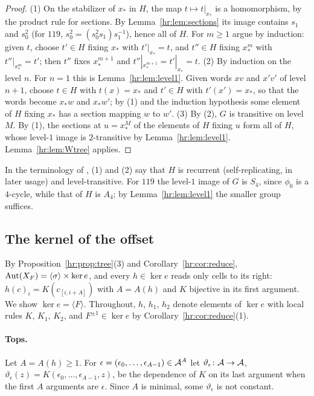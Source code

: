\begin{proof}
(1) On the stabilizer of $x_*$ in $H$, the map $t\mapsto t|_{x_*}$ is a homomorphism, by the product rule for sections. By Lemma~\ref{hr:lem:sections} its image contains $s_1$ and $s_0^2$ (for $119$, $s_0^2=(s_0^2s_1)s_1^{-1}$), hence all of $H$. For $m\ge1$ argue by induction: given $t$, choose $t'\in H$ fixing $x_*$ with $t'|_{x_*}=t$, and $t''\in H$ fixing $x_*^{m}$ with $t''|_{x_*^m}=t'$; then $t''$ fixes $x_*^{m+1}$ and $t''|_{x_*^{m+1}}=t'|_{x_*}=t$. (2) By induction on the level $n$. For $n=1$ this is Lemma~\ref{hr:lem:level1}. Given words $xv$ and $x'v'$ of level $n+1$, choose $t\in H$ with $t(x)=x_*$ and $t'\in H$ with $t'(x')=x_*$, so that the words become $x_*w$ and $x_*w'$; by (1) and the induction hypothesis some element of $H$ fixing $x_*$ has a section mapping $w$ to $w'$. (3) By (2), $G$ is transitive on level $M$. By (1), the sections at $u=x_*^M$ of the elements of $H$ fixing $u$ form all of $H$, whose level-$1$ image is $2$-transitive by Lemma~\ref{hr:lem:level1}. Lemma~\ref{hr:lem:Wtree} applies.
\end{proof}

In the terminology of \cite{Nekrashevych2005}, (1) and (2) say that $H$ is recurrent (self-replicating, in later usage) and level-transitive. For $119$ the level-$1$ image of $G$ is $S_4$, since $\phi_0$ is a $4$-cycle, while that of $H$ is $A_4$; by Lemma~\ref{hr:lem:level1} the smaller group suffices.

\subsection{The kernel of the offset}\label{hr:sec:kernel}

By Proposition~\ref{hr:prop:tree}(3) and Corollary~\ref{hr:cor:reduce}, $\operatorname{Aut}(X_F)=\langle\sigma\rangle\times\ker e$, and every $h\in\ker e$ reads only cells to its right: $h(c)_i=K(c_{[i,i+A]})$ with $A=A(h)$ and $K$ bijective in its first argument. We show $\ker e=\langle F\rangle$. Throughout, $h$, $h_1$, $h_2$ denote elements of $\ker e$ with local rules $K$, $K_1$, $K_2$, and $F^{\pm1}\in\ker e$ by Corollary~\ref{hr:cor:reduce}(1).

\paragraph{Tops.} Let $A=A(h)\ge1$. For $\epsilon=(\epsilon_0,\dots,\epsilon_{A-1})\in\mathcal{A}^A$ let $\vartheta_\epsilon\colon\mathcal{A}\to\mathcal{A}$, $\vartheta_\epsilon(z)=K(\epsilon_0,\dots,\epsilon_{A-1},z)$, be the dependence of $K$ on its last argument when the first $A$ arguments are $\epsilon$. Since $A$ is minimal, some $\vartheta_\epsilon$ is not constant.

